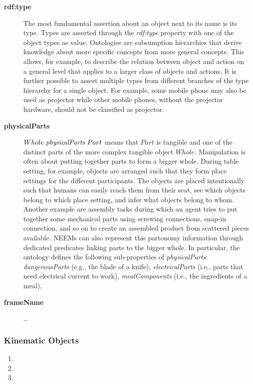 \begin{description}
\item[\textbf{rdf:type}] 
The most fundamental assertion about an object next to its name is its type.
Types are asserted through the \emph{rdf:type}
property with one of the object types as value.
Ontologies are subsumption hierarchies that derive 
knowledge about more specific concepts from more general concepts.
This allows, for example, to describe the relation between object and action
on a general level that applies to a larger class of objects and actions.
It is further possible to assert multiple types from different branches
of the type hierarchy for a single object.
For example, some mobile phone may also be used as projector while other mobile phones,
without the projector hardware, should not be classified as projector.
\item[\textbf{physicalParts}]
$Whole\ \emph{physicalParts}\ Part$ means
that $Part$ is tangible and one of the distinct parts of the
more complex tangible object $Whole$.
Manipulation is often about putting together parts to form a bigger whole.
During table setting, for example, objects are arranged such that they form
place settings for the different participants.
The objects are placed intentionally such that humans can easily reach them from their seat,
see which objects belong to which place setting, and infer what objects belong to whom.
Another example are assembly tasks during which an agent tries
to put together some mechanical parts using screwing connections, snap-in connection,
and so on to create an assembled product from scattered pieces available.
NEEMs can also represent this partonomy information through dedicated predicates
linking parts to the bigger whole.
In particular, the \ease ontology defines the following sub-properties of \emph{physicalParts}:
\emph{dangerousParts} (e.g., the blade of a knife),
\emph{electricalParts} (i.e., parts that need electrical current to work),
\emph{mealComponents} (i.e., the ingredients of a meal).
\item[\textbf{frameName}] \dots
\end{description}


\subsubsection{Kinematic Objects}
\begin{enumerate}
 \item {}
 \item {}
 \item {}
\end{enumerate}

